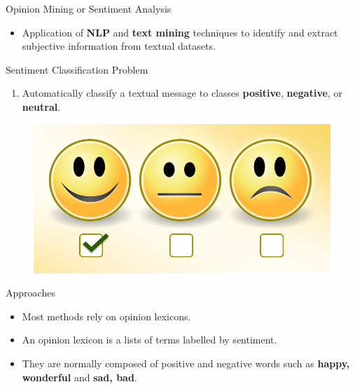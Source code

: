 \documentclass[handout]{beamer}
\begin{document}
\begin{frame}{Opinion Mining or Sentiment Analysis}
\begin{scriptsize}\begin{itemize}
 \item Application of \textbf{NLP} and \textbf{text mining} techniques to identify and extract subjective information from textual datasets.
\end{itemize}
\pause
\begin{block}{Sentiment Classification Problem}
  \begin{enumerate}
   \item Automatically classify a textual message to classes \textcolor[rgb]{0.00,0.00,1.00}{\textbf{positive}}, \textcolor[rgb]{1.00,0.00,0.00}{\textbf{negative}}, or \textcolor[rgb]{0.00,1.00,0.00}{\textbf{neutral}}. 
  \end{enumerate} 
\end{block}

  \begin{figure}[h]
        	\includegraphics[scale = 0.15]{pics/sent.png}
        \end{figure}


\begin{block}{Approaches}
\begin{itemize}
\item Most methods rely on opinion lexicons.
\item An opinion lexicon is a lists of terms labelled by sentiment.
\item They are normally composed of positive and negative words such as \textcolor[rgb]{0.00,0.00,1.00}{\textbf{happy, wonderful}} and \textcolor[rgb]{1.00,0.00,0.00}{\textbf{sad, bad}}.
\end{itemize}

\end{block}

\end{scriptsize}

\end{frame}
\end{document}
